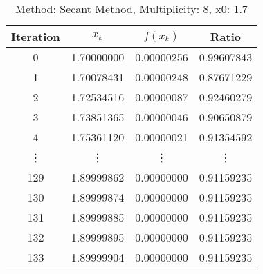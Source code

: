 \begin{table}
\centering
\caption{Method: Secant Method, Multiplicity: 8, x0: 1.7}
\label{tab:table_Secant_Method_8_1_7}
\begin{tabular}{c c c c}
\toprule
Iteration &      $x_k$ &   $f(x_k)$ &      Ratio \\
\midrule
        0 & 1.70000000 & 0.00000256 & 0.99607843 \\
        1 & 1.70078431 & 0.00000248 & 0.87671229 \\
        2 & 1.72534516 & 0.00000087 & 0.92460279 \\
        3 & 1.73851365 & 0.00000046 & 0.90650879 \\
        4 & 1.75361120 & 0.00000021 & 0.91354592 \\
   \vdots &     \vdots &     \vdots &     \vdots \\
      129 & 1.89999862 & 0.00000000 & 0.91159235 \\
      130 & 1.89999874 & 0.00000000 & 0.91159235 \\
      131 & 1.89999885 & 0.00000000 & 0.91159235 \\
      132 & 1.89999895 & 0.00000000 & 0.91159235 \\
      133 & 1.89999904 & 0.00000000 & 0.91159235 \\
\bottomrule
\end{tabular}
\end{table}

